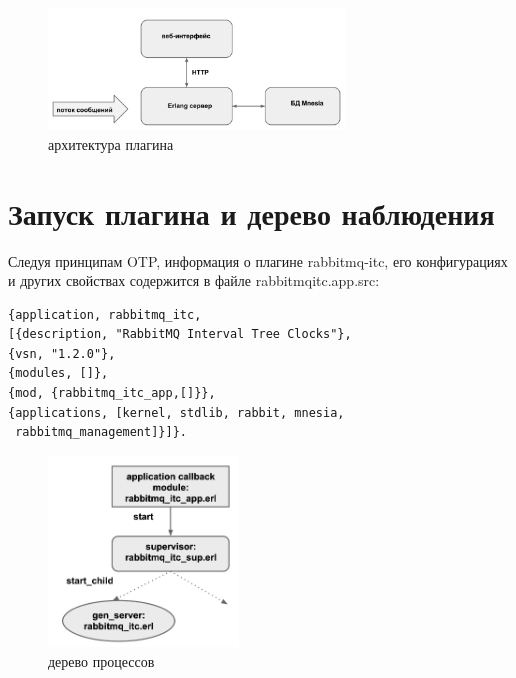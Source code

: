 \begin{figure}
\centering
\includegraphics[width=0.7\textwidth]{img/struct.png}
\caption{архитектура плагина}
\label{fig:plugin_struct}
\end{figure}
\section{Запуск плагина и дерево наблюдения}
Следуя принципам OTP, информация о плагине rabbitmq-itc, его конфигурациях и других свойствах содержится в файле rabbitmq\underline{\hspace{0.25cm}}itc.app.src:
\begin{lstlisting}
{application, rabbitmq_itc,
[{description, "RabbitMQ Interval Tree Clocks"},
{vsn, "1.2.0"},
{modules, []},
{mod, {rabbitmq_itc_app,[]}},
{applications, [kernel, stdlib, rabbit, mnesia,
 rabbitmq_management]}]}.
\end{lstlisting}
\begin{figure}
\centering
\includegraphics[width=0.45\textwidth]{img/sup.png}
\caption{дерево процессов}
\label{fig:process_tree}
\end{figure}
